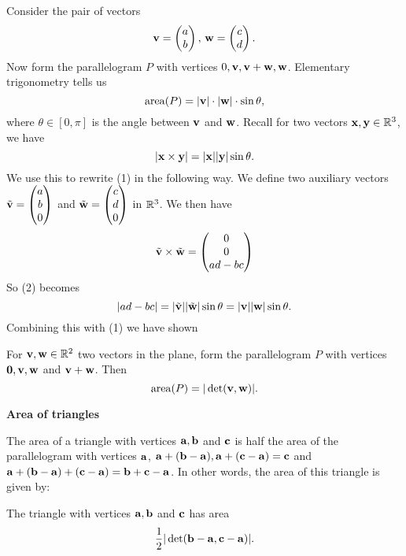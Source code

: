 \documentclass[10pt, a4paper]{article}
\begin{document}
Consider the pair of vectors
\[
\mathbf{v} = \begin{pmatrix} a \\ b \end{pmatrix},
\,\mathbf{w} = \begin{pmatrix} c \\ d \end{pmatrix}.
\]
Now form the parallelogram $P$ with vertices $0, \mathbf{v}, \mathbf{v + w}, \mathbf{w}$.
Elementary trigonometry tells us
\begin{equation}
    \mathrm{area}(P) = |\mathbf{v}| \cdot |\mathbf{w}| \cdot \sin\theta,
\end{equation}
where $\theta \in [0, \pi]$ is the angle between $\mathbf{v}$ and $\mathbf{w}$.
Recall for two vectors $\mathbf{x, y} \in \mathbb{R} ^ 3$,
we have
\begin{equation}
    |\mathbf{x \times y}| = |\mathbf{x}||\mathbf{y}|\sin\theta.
\end{equation}
We use this to rewrite (1) in the following way.
We define two auxiliary vectors $\Tilde{\mathbf{v}} = \begin{pmatrix}
    a \\ b \\ 0
\end{pmatrix}$ and $\Tilde{\mathbf{w}} = \begin{pmatrix}
    c \\ d \\ 0
\end{pmatrix}$ in $\mathbb{R} ^ 3$.
We then have
\[
\Tilde{\mathbf{v}} \times \Tilde{\mathbf{w}} = \begin{pmatrix}
    0 \\ 0 \\ ad - bc
\end{pmatrix}
\]
So (2) becomes
\[
|ad - bc| = |\Tilde{\mathbf{v}}||\Tilde{\mathbf{w}}|\sin\theta = |\mathbf{v}||\mathbf{w}|\sin\theta.
\]
Combining this with (1) we have shown
\begin{theorem}
    For $\mathbf{v, w} \in \mathbb{R} ^ 2$ two vectors in the plane,
    form the parallelogram $P$ with vertices $\mathbf{0, v, w}$ and $\mathbf{v + w}$.
    Then
    \[
    \mathrm{area}(P) = |\det(\mathbf{v, w})|.
    \]
\end{theorem}

\textbf{Area of triangles}

The area of a triangle with vertices $\mathbf{a, b}$ and $\mathbf{c}$ is half the area of the parallelogram with vertices $\mathbf{a}$,
$\mathbf{a + (b - a)}, \mathbf{a + (c - a)} = \mathbf{c}$ and $\mathbf{a + (b - a) + (c - a)} = \mathbf{b + c - a}$.
In other words,
the area of this triangle is given by:
\begin{proposition}
    The triangle with vertices $\mathbf{a, b}$ and $\mathbf{c}$ has area
    \[
    \frac{1}{2}|\det(\mathbf{b - a, c - a})|.
    \]
\end{proposition}
\end{document}
